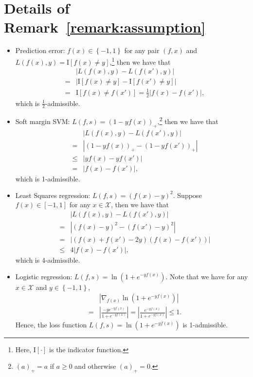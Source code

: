 \documentclass[11pt]{article}
\newcommand{\I}{\mathrm{I}}
\newcommand{\calX}{\mathcal{X}}
\begin{document}
	
	\section{Details of Remark~\ref{remark:assumption}}
	\label{sec:dis}
	
	\begin{itemize}
		\item Prediction error: $f(x)\in \left\{-1,1\right\}$ for any pair $(f,x)$ and $L(f(x),y) = \I\left[f(x)\neq y\right] $,\footnote{Here, $\I\left[\cdot\right]$ is the indicator function.} then we have that 
		\begin{eqnarray*}
			& & \left|L(f(x),y)-L(f(x'),y)\right| \\
			&=& \left|\I\left[f(x)\neq y\right]-\I\left[f(x')\neq y\right] \right| \\
			&=& \I\left[f(x)\neq f(x')\right]= \frac{1}{2} \left|f(x)-f(x') \right|,
		\end{eqnarray*}
		which is $\frac{1}{2}$-admissible.
		\item Soft margin SVM: $L(f,s) = (1-yf(x))_+$,\footnote{$(a)_+ = a$ if $a\geq 0$ and otherwise $(a)_+ = 0$.} then we have that
		\begin{eqnarray*}
			& &\left|L(f(x),y)-L(f(x'),y) \right| \\
			&=& \left|(1-yf(x))_+ -(1-yf(x'))_+ \right| \\
			&\leq& \left| yf(x)-yf(x') \right| \\
			&=& \left|f(x)-f(x')\right|,
		\end{eqnarray*}
		which is 1-admissible. 
		\item Least Squares regression: $L(f,s) = (f(x)-y)^2$. Suppose $f(x)\in [-1,1]$ for any $x\in \calX$, then we have that 
		\begin{eqnarray*}
			& & \left|L(f(x),y)-L(f(x'),y) \right| \\
			&=&  \left| (f(x)-y)^2 - (f(x')-y)^2 \right| \\
			&=& \left|(f(x)+f(x')-2y)(f(x)-f(x'))\right|\\
			&\leq& 4 \left|f(x)-f(x')\right|,
		\end{eqnarray*}
		which is 4-admissible.
		\item Logistic regression: $L(f,s) = \ln (1+e^{-y f(x)})$. 
		Note that we have for any $x\in \calX$ and $y\in \left\{-1,1\right\}$,
		\begin{eqnarray*}
			& &\left|\nabla_{f(x)} \ln (1+e^{-y f(x)}) \right| \\
			&=& \left|\frac{-y e^{-y f(x)}}{1+e^{-y f(x)}} \right| 
			= \left|\frac{e^{-y f(x)}}{1+e^{-y f(x)}} \right|
			\leq 1.
		\end{eqnarray*}
		Hence, the loss function $L(f,s) = \ln (1+e^{-y f(x)})$ is 1-admissible.
	\end{itemize}
	

	
\end{document}
